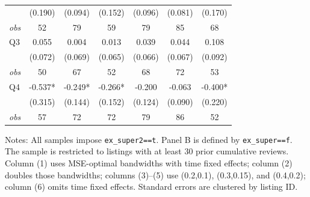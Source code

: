 \begin{table}[!htbp]
\begin{tabular}{lcccccc}
 & (0.190) & (0.094) & (0.152) & (0.096) & (0.081) & (0.170) \\
\textit{obs} & 52 & 79 & 59 & 79 & 85 & 68 \\
Q3 & 0.055 & 0.004 & 0.013 & 0.039 & 0.044 & 0.108 \\
 & (0.072) & (0.069) & (0.065) & (0.066) & (0.067) & (0.092) \\
\textit{obs} & 50 & 67 & 52 & 68 & 72 & 53 \\
Q4 & -0.537* & -0.249* & -0.266* & -0.200 & -0.063 & -0.400* \\
 & (0.315) & (0.144) & (0.152) & (0.124) & (0.090) & (0.220) \\
\textit{obs} & 57 & 72 & 72 & 79 & 86 & 52 \\
\bottomrule
\end{tabular}
\begin{minipage}{0.98\textwidth}\footnotesize
Notes: All samples impose \texttt{ex\_super2==t}. Panel B is defined by \texttt{ex\_super==f}. The sample is restricted to listings with at least 30 prior cumulative reviews. Column (1) uses MSE-optimal bandwidths with time fixed effects; column (2) doubles those bandwidths; columns (3)--(5) use (0.2,0.1), (0.3,0.15), and (0.4,0.2); column (6) omits time fixed effects. Standard errors are clustered by listing ID.
\end{minipage}
\end{table}

